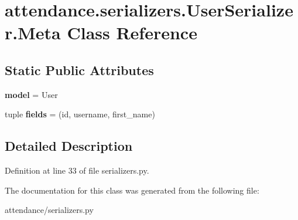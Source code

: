 \hypertarget{classattendance_1_1serializers_1_1_user_serializer_1_1_meta}{}\section{attendance.\+serializers.\+User\+Serializer.\+Meta Class Reference}
\label{classattendance_1_1serializers_1_1_user_serializer_1_1_meta}
\subsection*{Static Public Attributes}
\begin{DoxyCompactItemize}
\item 
\hypertarget{classattendance_1_1serializers_1_1_user_serializer_1_1_meta_adbbc7b585d8155be5fe611603d23605b}{}\label{classattendance_1_1serializers_1_1_user_serializer_1_1_meta_adbbc7b585d8155be5fe611603d23605b} 
{\bfseries model} = User
\item 
\hypertarget{classattendance_1_1serializers_1_1_user_serializer_1_1_meta_a33a012cf17e3d401b1c348e6b2a3a96c}{}\label{classattendance_1_1serializers_1_1_user_serializer_1_1_meta_a33a012cf17e3d401b1c348e6b2a3a96c} 
tuple {\bfseries fields} = (\textquotesingle{}id\textquotesingle{}, \textquotesingle{}username\textquotesingle{}, \textquotesingle{}first\+\_\+name\textquotesingle{})
\end{DoxyCompactItemize}


\subsection{Detailed Description}


Definition at line 33 of file serializers.\+py.



The documentation for this class was generated from the following file\+:\begin{DoxyCompactItemize}
\item 
attendance/serializers.\+py\end{DoxyCompactItemize}
